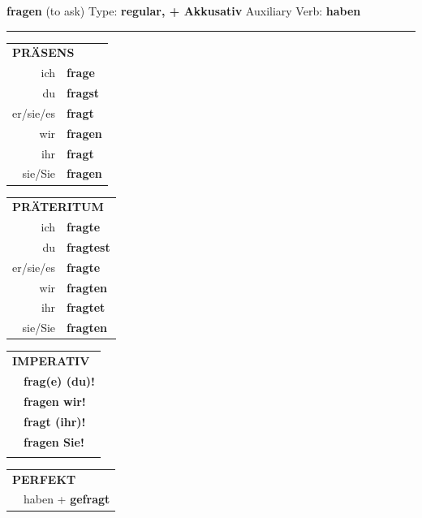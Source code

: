 \documentclass[10pt,a4paper]{revtex4-2}
\begin{document}
\begin{verbbox-acc}
    {\Large \bf fragen} (to ask) \hfill Type: \textbf{regular, + Akkusativ} \hfill Auxiliary Verb: \textbf{haben} 
    
     \vspace{5pt}

    \hrule
    
    \vspace{5pt}

  \begin{tabular}{rl}
     \multicolumn{2}{l}{\textbf{PRÄSENS} }\\
    ich & \textbf{frage}\\
    du & \textbf{fragst}\\
    er/sie/es & \textbf{fragt}\\
    wir & \textbf{fragen}\\
    ihr & \textbf{fragt}\\
    sie/Sie & \textbf{fragen}\\
  \end{tabular}
  \hfill
     \begin{tabular}{rl}
    \multicolumn{2}{l}{\textbf{PRÄTERITUM} }\\
    ich & \textbf{fragte}\\
    du & \textbf{fragtest}\\
    er/sie/es & \textbf{fragte}\\
    wir & \textbf{fragten}\\
    ihr & \textbf{fragtet}\\
    sie/Sie & \textbf{fragten}\\
  \end{tabular}
  \hfill
  \begin{tabular}{rl}
     \multicolumn{2}{l}{\textbf{IMPERATIV} }\\
   & \textbf{frag(e) (du)!}\\
   & \textbf{fragen wir!}\\
   & \textbf{fragt (ihr)!}\\
   & \textbf{fragen Sie!}\\
   & \vspace{10pt}
  \end{tabular}

    \vspace{10pt}

 \begin{tabular}{rl}
     \multicolumn{2}{l}{\textbf{PERFEKT}}\\
   & haben + \textbf{gefragt}\\
  \end{tabular}
\hfill
   \begin{tabular}{rl}
   

\end{tabular}
\end{verbbox-acc}
\end{document}
